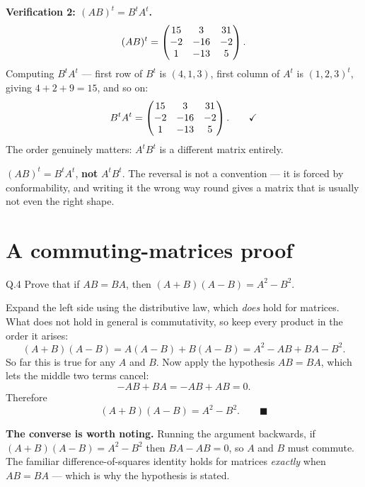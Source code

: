 \begin{solution}
\medskip
\textbf{Verification 2: $(AB)^{t}=B^{t}A^{t}$.}
\[
(AB)^{t}=\begin{pmatrix}15&3&31\\-2&-16&-2\\1&-13&5\end{pmatrix}.
\]
Computing $B^{t}A^{t}$ --- first row of $B^{t}$ is $(4,1,3)$, first column of
$A^{t}$ is $(1,2,3)^{t}$, giving $4+2+9=15$, and so on:
\[
B^{t}A^{t}=\begin{pmatrix}15&3&31\\-2&-16&-2\\1&-13&5\end{pmatrix}. \qquad\checkmark
\]
The order genuinely matters: $A^{t}B^{t}$ is a different matrix entirely.

\end{solution}

\begin{pitfall}
$(AB)^{t}=B^{t}A^{t}$, \textbf{not} $A^{t}B^{t}$. The reversal is not a
convention --- it is forced by conformability, and writing it the wrong way
round gives a matrix that is usually not even the right shape.
\end{pitfall}

\section{A commuting-matrices proof}

\begin{question}{Q.4}
Prove that if $AB=BA$, then $(A+B)(A-B)=A^{2}-B^{2}$.
\end{question}

\begin{solution}
Expand the left side using the distributive law, which \emph{does} hold for
matrices. What does not hold in general is commutativity, so keep every product
in the order it arises:
\[
(A+B)(A-B)=A(A-B)+B(A-B)=A^{2}-AB+BA-B^{2}.
\]
So far this is true for any $A$ and $B$. Now apply the hypothesis $AB=BA$,
which lets the middle two terms cancel:
\[
-AB+BA=-AB+AB=0 .
\]
Therefore
\[
(A+B)(A-B)=A^{2}-B^{2}. \qquad\blacksquare
\]

\medskip
\textbf{The converse is worth noting.} Running the argument backwards, if
$(A+B)(A-B)=A^{2}-B^{2}$ then $BA-AB=0$, so $A$ and $B$ must commute. The
familiar difference-of-squares identity holds for matrices \emph{exactly} when
$AB=BA$ --- which is why the hypothesis is stated.

\end{solution}

